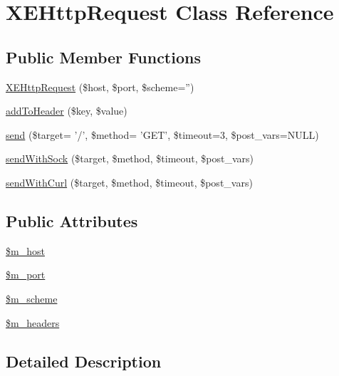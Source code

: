 \hypertarget{classXEHttpRequest}{\section{X\-E\-Http\-Request Class Reference}
\label{classXEHttpRequest}
}
\subsection*{Public Member Functions}
\begin{DoxyCompactItemize}
\item 
\hyperlink{classXEHttpRequest_aa8a672ad4e5c3cc8d3b7a9cecc29d349}{X\-E\-Http\-Request} (\$host, \$port, \$scheme='')
\item 
\hyperlink{classXEHttpRequest_af936bdc66e6dcabbd8934afc5e210063}{add\-To\-Header} (\$key, \$value)
\item 
\hyperlink{classXEHttpRequest_a8f75aef64b09a7b2d007bdce562eaaf6}{send} (\$target= '/', \$method= 'G\-E\-T', \$timeout=3, \$post\-\_\-vars=N\-U\-L\-L)
\item 
\hyperlink{classXEHttpRequest_a9e316ec4c68dfe9a124327287dae2754}{send\-With\-Sock} (\$target, \$method, \$timeout, \$post\-\_\-vars)
\item 
\hyperlink{classXEHttpRequest_ae6412b6f079b88a67f43602d3cdae2d7}{send\-With\-Curl} (\$target, \$method, \$timeout, \$post\-\_\-vars)
\end{DoxyCompactItemize}
\subsection*{Public Attributes}
\begin{DoxyCompactItemize}
\item 
\hyperlink{classXEHttpRequest_ad88148dced2b42017a96b2a5dd0b533a}{\$m\-\_\-host}
\item 
\hyperlink{classXEHttpRequest_a35c62f61b5ad2c200c53a58dd43a2784}{\$m\-\_\-port}
\item 
\hyperlink{classXEHttpRequest_a501919f00934ef2cc76300fa32c2f19d}{\$m\-\_\-scheme}
\item 
\hyperlink{classXEHttpRequest_a36df236b46af2f09dd9020096dbaed22}{\$m\-\_\-headers}
\end{DoxyCompactItemize}


\subsection{Detailed Description}


